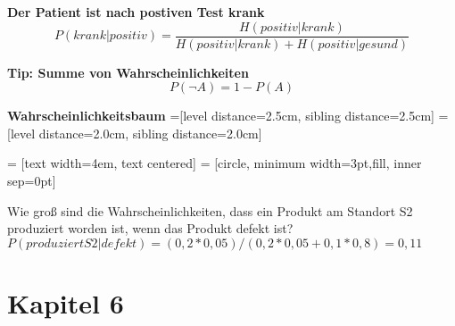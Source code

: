 \documentclass[11pt,twocolumn,fleqn]{article}
\begin{document}
\textbf{Der Patient ist nach postiven Test krank}
\begin{equation*}
P(krank|positiv) = \frac{H(positiv | krank)}{H(positiv|krank) + H(positiv|gesund)}
\end{equation*}

\textbf{Tip: Summe von Wahrscheinlichkeiten}
\begin{equation*}
P(\neg A) = 1 - P(A)
\end{equation*}

\textbf{Wahrscheinlichkeitsbaum}
=[level distance=2.5cm, sibling distance=2.5cm]
=[level distance=2.0cm, sibling distance=2.0cm]

 = [text width=4em, text centered]
 = [circle, minimum width=3pt,fill, inner sep=0pt]

Wie groß sind die Wahrscheinlichkeiten, dass ein Produkt am Standort S2 produziert worden ist, wenn das Produkt defekt ist?
$P(produziert S2 | defekt) = (0,2 * 0,05) / (0,2*0,05 + 0,1 * 0,8) = 0,11$ 


\section{Kapitel 6}
\end{document}

